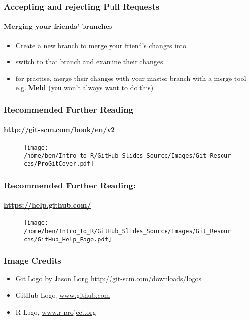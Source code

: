 \documentclass[xcolor=dvipsnames]{beamer}
\begin{document}
\begin{frame}
\frametitle{Accepting and rejecting Pull Requests}
\framesubtitle{Merging your friends' branches}
\begin{itemize}
\item Create a new branch to merge your friend's changes into 
\newline
\item switch to that branch and examine their changes
\newline
\item for practise, merge their changes with your master branch with a merge tool e.g. \textbf{Meld} (you won't always want to do this)
\end{itemize}
\end{frame}

\begin{frame}
\frametitle{Recommended Further Reading}
\framesubtitle{\url{http://git-scm.com/book/en/v2}}
\begin{center}
\begin{figure}
\texttt{[image: /home/ben/Intro\_to\_R/GitHub\_Slides\_Source/Images/Git\_Resources/ProGitCover.pdf]}
\end{figure}
\end{center}

\end{frame}

\begin{frame}
\frametitle{Recommended Further Reading:}
\framesubtitle{\url{https://help.github.com/}}
%
\begin{center}
\begin{figure}
\texttt{[image: /home/ben/Intro\_to\_R/GitHub\_Slides\_Source/Images/Git\_Resources/GitHub\_Help\_Page.pdf]}
\end{figure}

\end{center}

\end{frame}

\begin{frame}
\frametitle{Image Credits}
\begin{itemize}
\item Git Logo by Jason Long \url{http://git-scm.com/downloads/logos}
\item GitHub Logo, \url{www.github.com}
\item R Logo, \url{www.r-project.org}
\end{itemize}
\end{frame}
\end{document}
